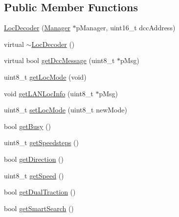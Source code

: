\subsection*{Public Member Functions}
\begin{DoxyCompactItemize}
\item 
\hyperlink{classTBT_1_1LocDecoder_ae8563de74c15f27c40644bf8218d26d9_ae8563de74c15f27c40644bf8218d26d9}{Loc\+Decoder} (\hyperlink{classTBT_1_1Manager}{Manager} $\ast$p\+Manager, uint16\+\_\+t dcc\+Address)
\item 
virtual \hyperlink{classTBT_1_1LocDecoder_aecf37f8d8a0084573e6f10df283750de_aecf37f8d8a0084573e6f10df283750de}{$\sim$\+Loc\+Decoder} ()
\item 
virtual bool \hyperlink{classTBT_1_1LocDecoder_a00361e87af456a020bc6ec16c08237ef_a00361e87af456a020bc6ec16c08237ef}{get\+Dcc\+Message} (uint8\+\_\+t $\ast$p\+Msg)
\item 
uint8\+\_\+t \hyperlink{classTBT_1_1LocDecoder_afaa04ad0561a39212d69d0aabece751e_afaa04ad0561a39212d69d0aabece751e}{get\+Loc\+Mode} (void)
\item 
void \hyperlink{classTBT_1_1LocDecoder_a257c294961f07e5f2134b1550355a661_a257c294961f07e5f2134b1550355a661}{get\+L\+A\+N\+Loc\+Info} (uint8\+\_\+t $\ast$p\+Msg)
\item 
uint8\+\_\+t \hyperlink{classTBT_1_1LocDecoder_a0ed2026cd64ba1e2aa411e1228027f4e_a0ed2026cd64ba1e2aa411e1228027f4e}{set\+Loc\+Mode} (uint8\+\_\+t new\+Mode)
\item 
bool \hyperlink{classTBT_1_1LocDecoder_a3ec11c7c270d1eeb00e6893bff8f0831_a3ec11c7c270d1eeb00e6893bff8f0831}{get\+Busy} ()
\item 
uint8\+\_\+t \hyperlink{classTBT_1_1LocDecoder_ae89a770202444bca60595182fe4a9c90_ae89a770202444bca60595182fe4a9c90}{get\+Speedsteps} ()
\item 
bool \hyperlink{classTBT_1_1LocDecoder_a5c570e65adde5ee526986155d509da47_a5c570e65adde5ee526986155d509da47}{get\+Direction} ()
\item 
uint8\+\_\+t \hyperlink{classTBT_1_1LocDecoder_a7305c8ab02a76b48b2b5ab93f1aec24b_a7305c8ab02a76b48b2b5ab93f1aec24b}{get\+Speed} ()
\item 
bool \hyperlink{classTBT_1_1LocDecoder_a7f4c04a5a306ea827494b29789cc401e_a7f4c04a5a306ea827494b29789cc401e}{get\+Dual\+Traction} ()
\item 
bool \hyperlink{classTBT_1_1LocDecoder_ab0a2b2953657fbc2589f90918883d03a_ab0a2b2953657fbc2589f90918883d03a}{get\+Smart\+Search} ()
\item 

\end{DoxyCompactItemize}
